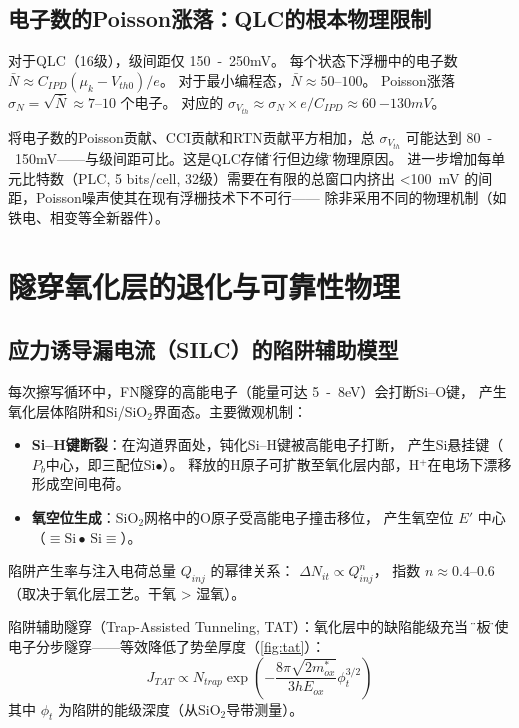 \documentclass[11pt,a4paper,twoside]{article}
\theoremstyle{definition}
\theoremstyle{plain}
\theoremstyle{remark}
\begin{document}
\subsection{电子数的Poisson涨落：QLC的根本物理限制}

对于QLC（16级），级间距仅 \SI{150}{-250}{mV}。
每个状态下浮栅中的电子数 $\bar{N} \approx C_{IPD} (\mu_k - V_{th0}) / e$。
对于最小编程态，$\bar{N} \approx 50$--$100$。
Poisson涨落 $\sigma_N = \sqrt{\bar{N}} \approx 7$--$10$ 个电子。
对应的 $\sigma_{V_{th}} \approx \sigma_N \times e / C_{IPD}
\approx \SI{60}{-130}{mV}$。

将电子数的Poisson贡献、CCI贡献和RTN贡献平方相加，总 $\sigma_{V_{th}}$ 可能达到
\SI{80}{-150}{mV}——与级间距可比。这是QLC存储\"可行但边缘\"的物理原因。
进一步增加每单元比特数（PLC, 5 bits/cell, 32级）需要在有限的总窗口内挤出
\SI{<100}{mV} 的间距，Poisson噪声使其在现有浮栅技术下不可行——
除非采用不同的物理机制（如铁电、相变等全新器件）。

\section{隧穿氧化层的退化与可靠性物理}
\label{sec:degradation}

\subsection{应力诱导漏电流（SILC）的陷阱辅助模型}

每次擦写循环中，FN隧穿的高能电子（能量可达 \SI{5}{-8}{eV}）会打断Si--O键，
产生氧化层体陷阱和Si/SiO$_2$界面态。主要微观机制：

\begin{itemize}
  \item \textbf{Si--H键断裂}：在沟道界面处，钝化Si--H键被高能电子打断，
  产生Si悬挂键（$P_b$中心，即三配位Si$\bullet$）。
  释放的H原子可扩散至氧化层内部，H$^+$在电场下漂移形成空间电荷。
  \item \textbf{氧空位生成}：SiO$_2$网格中的O原子受高能电子撞击移位，
  产生氧空位 $E'$ 中心（$\equiv \text{Si}\bullet\,\text{Si}\equiv$）。
\end{itemize}

陷阱产生率与注入电荷总量 $Q_{inj}$ 的幂律关系：
$\Delta N_{it} \propto Q_{inj}^n$，
指数 $n \approx 0.4$--$0.6$（取决于氧化层工艺。干氧 > 湿氧）。

陷阱辅助隧穿（Trap-Assisted Tunneling, TAT）：氧化层中的缺陷能级充当
\"跳板\"，使电子分步隧穿——等效降低了势垒厚度（\cref{fig:tat}）：
\begin{equation}\label{eq:tat}
  J_{TAT} \propto N_{trap} \exp\!\left(
    -\frac{8\pi\sqrt{2m_{ox}^*}}{3h E_{ox}} \phi_t^{3/2}
  \right)
\end{equation}
其中 $\phi_t$ 为陷阱的能级深度（从SiO$_2$导带测量）。
\end{document}
